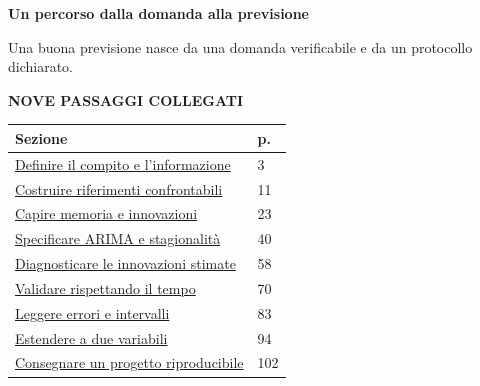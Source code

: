\documentclass[12pt,aspectratio=1610]{beamer}
\newcommand{\PLabel}[1]{\par{\color{Classical}\bfseries\fontsize{9}{11}\selectfont\MakeUppercase{#1}}\par\vspace{1.8mm}}
\begin{document}
\begin{frame}[plain]\hypertarget{slide2}{}
\begin{lrbox}{\TitleBox}
\begin{minipage}[t]{17.7cm}\raggedright\color{Ink}\fontsize{11.3}{14.8}\selectfont
\color{Navy}\bfseries\fontsize{20.6}{24.5}\selectfont Un percorso dalla domanda alla previsione
\end{minipage}\end{lrbox}

\begin{lrbox}{\RecallBox}
\begin{minipage}[t]{14.3cm}\raggedright\color{Ink}\fontsize{11.3}{14.8}\selectfont
\fontsize{10.3}{13.8}\selectfont Una buona previsione nasce da una domanda verificabile e da un protocollo dichiarato.
\end{minipage}\end{lrbox}

\begin{lrbox}{\PilotLeftBox}
\begin{minipage}[t]{10.05cm}\raggedright\color{Ink}\fontsize{11.3}{14.8}\selectfont
\PLabel{Nove passaggi collegati}
{\fontsize{10.2}{13.1}\selectfont\renewcommand{\arraystretch}{1.45}\begin{tabular}{@{}p{8.3cm}p{0.7cm}@{}}\toprule
\textbf{Sezione} & \textbf{p.}\\\midrule
\hyperlink{slide3}{Definire il compito e l’informazione} & 3\\
\hyperlink{slide11}{Costruire riferimenti confrontabili} & 11\\
\hyperlink{slide23}{Capire memoria e innovazioni} & 23\\
\hyperlink{slide40}{Specificare ARIMA e stagionalità} & 40\\
\hyperlink{slide58}{Diagnosticare le innovazioni stimate} & 58\\
\hyperlink{slide70}{Validare rispettando il tempo} & 70\\
\hyperlink{slide83}{Leggere errori e intervalli} & 83\\
\hyperlink{slide94}{Estendere a due variabili} & 94\\
\hyperlink{slide102}{Consegnare un progetto riproducibile} & 102\\
\bottomrule\end{tabular}}


\end{minipage}
\end{lrbox}
\end{frame}
\end{document}
